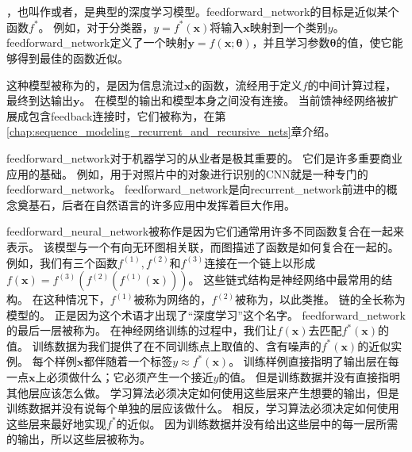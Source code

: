 \chapter{}
\label{chap:deep_feedforward_networks}

，也叫作或者，是典型的深度学习模型。\gls{feedforward_network}的目标是近似某个函数$f^*$。
例如，对于分类器，$y = f^*(\bm{x})$将输入$\bm{x}$映射到一个类别$y$。
\gls{feedforward_network}定义了一个映射$\bm{y} = f(\bm{x}; \bm{\theta})$，并且学习参数$\bm{\theta}$的值，使它能够得到最佳的函数近似。

这种模型被称为的，是因为信息流过$\bm{x}$的函数，流经用于定义$f$的中间计算过程，最终到达输出$\bm{y}$。%
在模型的输出和模型本身之间没有连接。
当前馈神经网络被扩展成包含\gls{feedback}连接时，它们被称为，在第\ref{chap:sequence_modeling_recurrent_and_recursive_nets}章介绍。

\gls{feedforward_network}对于机器学习的从业者是极其重要的。
它们是许多重要商业应用的基础。
例如，用于对照片中的对象进行识别的\gls{CNN}就是一种专门的\gls{feedforward_network}。
\gls{feedforward_network}是向\gls{recurrent_network}前进中的概念奠基石，后者在自然语言的许多应用中发挥着巨大作用。

\gls{feedforward_neural_network}被称作是因为它们通常用许多不同函数复合在一起来表示。
该模型与一个有向无环图相关联，而图描述了函数是如何复合在一起的。
例如，我们有三个函数$f^{(1)}, f^{(2)}$和$f^{(3)}$连接在一个链上以形成$f(\bm{x}) = f^{(3)}(f^{(2)}(f^{(1)}(\bm{x})) )$。
这些链式结构是神经网络中最常用的结构。
在这种情况下，$f^{(1)}$被称为网络的，$f^{(2)}$被称为，以此类推。
链的全长称为模型的。
正是因为这个术语才出现了``深度学习''这个名字。
\gls{feedforward_network}的最后一层被称为。
在神经网络训练的过程中，我们让$f(\bm{x})$去匹配$f^*(\bm{x})$的值。
训练数据为我们提供了在不同训练点上取值的、含有噪声的$f^*(\bm{x})$的近似实例。
每个样例$\bm{x}$都伴随着一个标签$y\approx f^*(\bm{x})$。
训练样例直接指明了输出层在每一点$\bm{x}$上必须做什么；它必须产生一个接近$y$的值。
但是训练数据并没有直接指明其他层应该怎么做。
学习算法必须决定如何使用这些层来产生想要的输出，但是训练数据并没有说每个单独的层应该做什么。
相反，学习算法必须决定如何使用这些层来最好地实现$f^*$的近似。
因为训练数据并没有给出这些层中的每一层所需的输出，所以这些层被称为。

